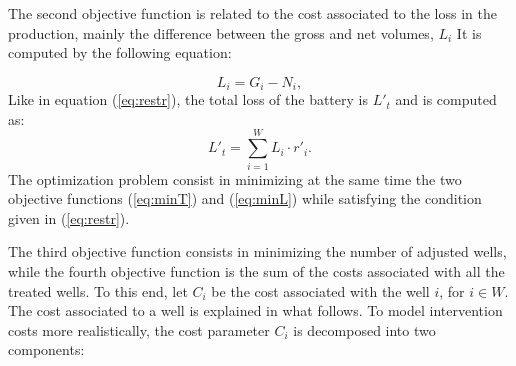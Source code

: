 The second objective function is related to the cost associated to the loss in the production, mainly the difference between the gross and net volumes, $L_i$ It is computed by the following equation:

\begin{equation}
    L_i = G_i - N_i,
\end{equation}
Like in equation (\ref{eq:restr}), the total loss of the battery is $L'_t$ and is computed as:
\begin{equation} \label{eq:minL}
    L'_t = \sum_{i = 1}^{W} L_i \cdot r'_i.
\end{equation}
The optimization problem consist in minimizing at the same time the two objective functions (\ref{eq:minT}) and (\ref{eq:minL}) while satisfying the condition given in (\ref{eq:restr}).







The third objective function consists in minimizing the number of adjusted wells, while the fourth objective function is the sum of the costs associated with all the treated wells. To this end, let $C_i$ be the cost associated with the well $i$, for $i\in W$. The cost associated to a well is explained in what follows.
To model intervention costs more realistically, the cost parameter $C_i$ is decomposed into two components:


